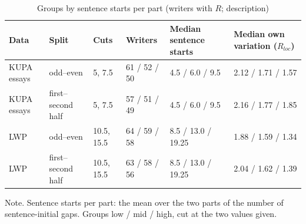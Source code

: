 \begin{table}[htbp]
\caption{Groups by sentence starts per part (writers with $R$; description)}
\label{tab:groups}
\footnotesize
\begin{tabularx}{\linewidth}{@{}llllXX@{}}
\toprule
Data & Split & Cuts & Writers & Median sentence starts & Median own variation ($R_{loc}$) \\
\midrule
KUPA essays & odd--even & 5, 7.5 & 61 / 52 / 50 & 4.5 / 6.0 / 9.5 & 2.12 / 1.71 / 1.57 \\
KUPA essays & first--second half & 5, 7.5 & 57 / 51 / 49 & 4.5 / 6.0 / 9.5 & 2.16 / 1.77 / 1.85 \\
LWP & odd--even & 10.5, 15.5 & 64 / 59 / 58 & 8.5 / 13.0 / 19.25 & 1.88 / 1.59 / 1.34 \\
LWP & first--second half & 10.5, 15.5 & 63 / 58 / 56 & 8.5 / 13.0 / 19.25 & 2.04 / 1.62 / 1.39 \\
\bottomrule
\end{tabularx}
\par\smallskip\footnotesize Note. Sentence starts per part: the mean over the two parts of the number of sentence-initial gaps. Groups low / mid / high, cut at the two values given.
\end{table}
